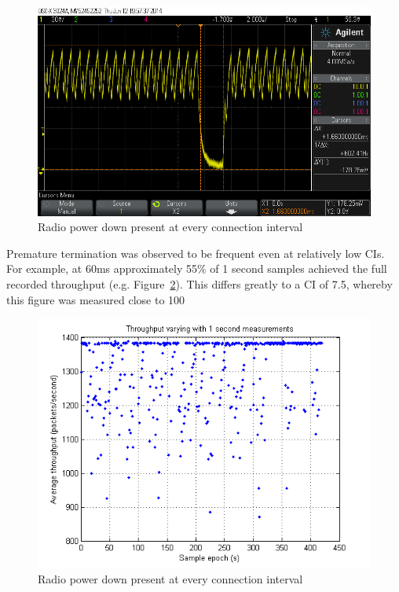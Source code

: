 \documentclass[]{article}
\begin{document}
\begin{figure}[H]
	\begin{center}
		\includegraphics[width = \textwidth]{cilimit}
	\end{center}
	\caption{Radio power down present at every connection interval}
	\label{fig:cilimit}
\end{figure}

Premature termination was observed to be frequent even at relatively low \ac{CI}s. For example, at 60ms approximately 55$\%$ of 1 second samples achieved the full recorded throughput   (e.g. Figure~\ref{fig:60cithroughput}). This differs greatly to a \ac{CI} of 7.5, whereby this figure was measured close to 100%

\begin{figure}[H]
	\begin{center}
		\includegraphics[width = \textwidth]{60cithroughput}
	\end{center}
	\caption{Radio power down present at every connection interval}
	\label{fig:60cithroughput}
\end{figure}
\end{document}
